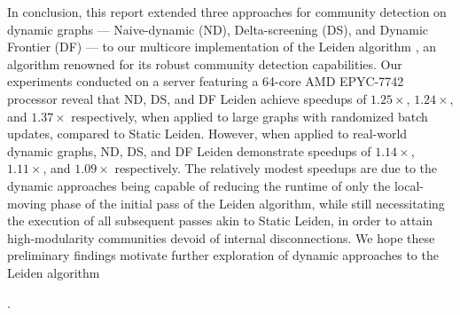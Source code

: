 In conclusion, this report extended three approaches for community detection on dynamic graphs --- Naive-dynamic (ND), Delta-screening (DS), and Dynamic Frontier (DF) --- to our multicore implementation \cite{sahu2023gveleiden} of the Leiden algorithm \cite{com-traag19}, an algorithm renowned for its robust community detection capabilities. Our experiments conducted on a server featuring a 64-core AMD EPYC-7742 processor reveal that ND, DS, and DF Leiden achieve speedups of $1.25\times$, $1.24\times$, and $1.37\times$ respectively, when applied to large graphs with randomized batch updates, compared to Static Leiden. However, when applied to real-world dynamic graphs, ND, DS, and DF Leiden demonstrate speedups of $1.14\times$, $1.11\times$, and $1.09\times$ respectively. The relatively modest speedups are due to the dynamic approaches being capable of reducing the runtime of only the local-moving phase of the initial pass of the Leiden algorithm, while still necessitating the execution of all subsequent passes akin to Static Leiden, in order to attain high-modularity communities devoid of internal disconnections. We hope these preliminary findings motivate further exploration of dynamic approaches to the Leiden algorithm.
